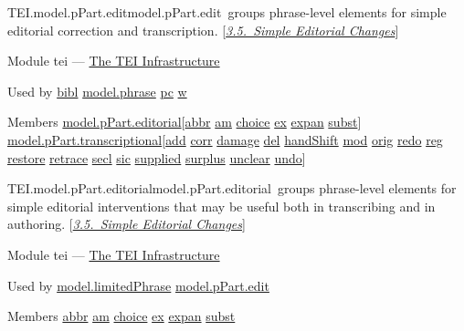 \begin{reflist}
\item[]\begin{specHead}{TEI.model.pPart.edit}{model.pPart.edit} groups phrase-level elements for simple editorial correction and transcription. [\textit{\hyperref[COED]{3.5.\ Simple Editorial Changes}}]\end{specHead} 
    \item[{Module}]
  tei — \hyperref[ST]{The TEI Infrastructure}
    \item[{Used by}]
  \hyperref[TEI.bibl]{bibl} \hyperref[TEI.model.phrase]{model.phrase} \hyperref[TEI.pc]{pc} \hyperref[TEI.w]{w}
    \item[{Members}]
  \hyperref[TEI.model.pPart.editorial]{model.pPart.editorial}[\hyperref[TEI.abbr]{abbr} \hyperref[TEI.am]{am} \hyperref[TEI.choice]{choice} \hyperref[TEI.ex]{ex} \hyperref[TEI.expan]{expan} \hyperref[TEI.subst]{subst}] \hyperref[TEI.model.pPart.transcriptional]{model.pPart.transcriptional}[\hyperref[TEI.add]{add} \hyperref[TEI.corr]{corr} \hyperref[TEI.damage]{damage} \hyperref[TEI.del]{del} \hyperref[TEI.handShift]{handShift} \hyperref[TEI.mod]{mod} \hyperref[TEI.orig]{orig} \hyperref[TEI.redo]{redo} \hyperref[TEI.reg]{reg} \hyperref[TEI.restore]{restore} \hyperref[TEI.retrace]{retrace} \hyperref[TEI.secl]{secl} \hyperref[TEI.sic]{sic} \hyperref[TEI.supplied]{supplied} \hyperref[TEI.surplus]{surplus} \hyperref[TEI.unclear]{unclear} \hyperref[TEI.undo]{undo}]
\end{reflist}  
\begin{reflist}
\item[]\begin{specHead}{TEI.model.pPart.editorial}{model.pPart.editorial} groups phrase-level elements for simple editorial interventions that may be useful both in transcribing and in authoring. [\textit{\hyperref[COED]{3.5.\ Simple Editorial Changes}}]\end{specHead} 
    \item[{Module}]
  tei — \hyperref[ST]{The TEI Infrastructure}
    \item[{Used by}]
  \hyperref[TEI.model.limitedPhrase]{model.limitedPhrase} \hyperref[TEI.model.pPart.edit]{model.pPart.edit}
    \item[{Members}]
  \hyperref[TEI.abbr]{abbr} \hyperref[TEI.am]{am} \hyperref[TEI.choice]{choice} \hyperref[TEI.ex]{ex} \hyperref[TEI.expan]{expan} \hyperref[TEI.subst]{subst}
\end{reflist}  
